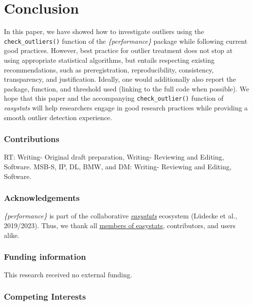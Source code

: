 \documentclass{article}
\begin{document}
\hypertarget{conclusion}{%
\section{Conclusion}\label{conclusion}}

In this paper, we have showed how to investigate outliers using the
\texttt{check\_outliers()} function of the \emph{\{performance\}}
package while following current good practices. However, best practice
for outlier treatment does not stop at using appropriate statistical
algorithms, but entails respecting existing recommendations, such as
preregistration, reproducibility, consistency, transparency, and
justification. Ideally, one would additionally also report the package,
function, and threshold used (linking to the full code when possible).
We hope that this paper and the accompanying \texttt{check\_outlier()}
function of \emph{easystats} will help researchers engage in good
research practices while providing a smooth outlier detection
experience.

\hypertarget{contributions}{%
\subsubsection{Contributions}\label{contributions}}

RT: Writing- Original draft preparation, Writing- Reviewing and Editing,
Software. MSB-S, IP, DL, BMW, and DM: Writing- Reviewing and Editing,
Software.

\hypertarget{acknowledgements}{%
\subsubsection{Acknowledgements}\label{acknowledgements}}

\emph{\{performance\}} is part of the collaborative
\href{https://github.com/easystats/easystats}{\emph{easystats}}
ecosystem (Lüdecke et al., 2019/2023). Thus, we thank all
\href{https://github.com/orgs/easystats/people}{members of easystats},
contributors, and users alike.

\hypertarget{funding-information}{%
\subsubsection{Funding information}\label{funding-information}}

This research received no external funding.

\hypertarget{competing-interests}{%
\subsubsection{Competing Interests}\label{competing-interests}}
\end{document}
